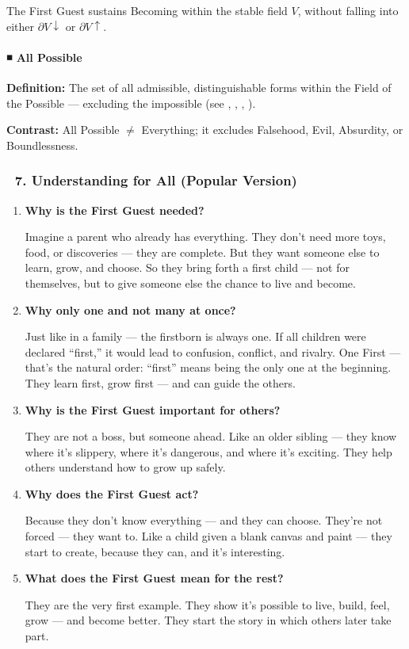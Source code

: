 \documentclass[12pt]{article}
\begin{document}
The First Guest sustains Becoming within the stable field $V$, without falling into either $\partial V \downarrow$ or $\partial V \uparrow$.

\bigskip

\paragraph{◾ All Possible}

\textbf{Definition:} The set of all admissible, distinguishable forms within the Field of the Possible — excluding the impossible (see \text{[1]}, \text{[2]}, \text{[4.3]}, \text{[5]}).

\textbf{Contrast:} All Possible $\neq$ Everything; it excludes Falsehood, Evil, Absurdity, or Boundlessness.

\subsubsection*{🔹 7. Understanding for All (Popular Version)}

\begin{enumerate}
\item \textbf{Why is the First Guest needed?}

Imagine a parent who already has everything. They don’t need more toys, food, or discoveries — they are complete. But they want someone else to learn, grow, and choose. So they bring forth a first child — not for themselves, but to give someone else the chance to live and become.

\item \textbf{Why only one and not many at once?}

Just like in a family — the firstborn is always one. If all children were declared ``first,'' it would lead to confusion, conflict, and rivalry. One First — that's the natural order: ``first'' means being the only one at the beginning. They learn first, grow first — and can guide the others.

\item \textbf{Why is the First Guest important for others?}

They are not a boss, but someone ahead. Like an older sibling — they know where it’s slippery, where it’s dangerous, and where it’s exciting. They help others understand how to grow up safely.

\item \textbf{Why does the First Guest act?}

Because they don’t know everything — and they can choose. They’re not forced — they want to. Like a child given a blank canvas and paint — they start to create, because they can, and it’s interesting.

\item \textbf{What does the First Guest mean for the rest?}

They are the very first example. They show it’s possible to live, build, feel, grow — and become better. They start the story in which others later take part.
\end{enumerate}
\end{document}
